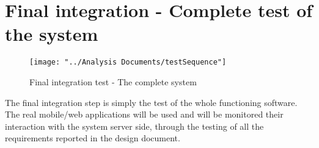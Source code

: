 \section{\label{final}Final integration - Complete test of the system}

\begin{figure}[H]
	\centering
	\texttt{[image: "../Analysis Documents/testSequence"]}
	\caption{Final integration test - The complete system}
	\label{fig:Ifinal}
\end{figure}

The final integration step is simply the test of the whole functioning software. The real mobile/web applications will be used and will be monitored their interaction with the system server side, through the testing of all the requirements reported in the design document.
